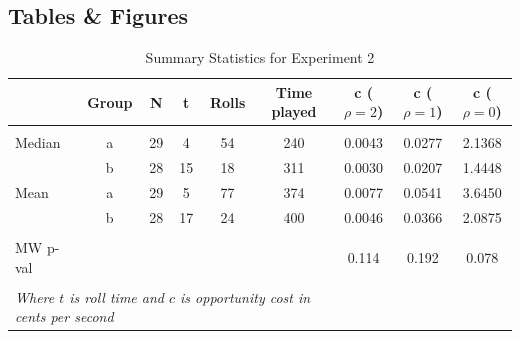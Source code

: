 \documentclass[a4paper,12pt]{article}
\begin{document}
\begin{appendices}

\section{Tables \& Figures}
\label{appendix:graphs}


\begin{table}
  \caption{Summary Statistics for Experiment 2}
  \label{table:descriptive-3}
  \begin{center}
    \begin{tabular}{lcccccccc}
      \hline
      & Group & N & t &  Rolls  &  Time played & c ($\rho = 2$) & c ($\rho = 1$) & c ($\rho = 0$)\\
      \hline
      \hline \\ [-1.8ex]
      Median &         a & 29 &          4 &    54 &  240 &                 0.0043 &                 0.0277 &                    2.1368  \\
      &         b & 28 &         15 &    18 &  311 &                0.0030 &                 0.0207 &                    1.4448  \\
      Mean &         a & 29 &          5 &    77 &  374 &              0.0077 &                 0.0541 &                    3.6450  \\
       &         b & 28 &         17 &    24 &  400 &              0.0046 &                 0.0366 &                    2.0875  \\
      \hline \\ [-1.8ex]
      MW p-val & & & & & & 0.114 & 0.192 & 0.078 \\
      \hline \\ [-1.8ex]
      \multicolumn{6}{l}{\textit{Where $t$ is roll time and $c$ is opportunity cost in cents per second}} \\
    \end{tabular}
  \end{center}
\end{table}


\end{appendices}
\end{document}
